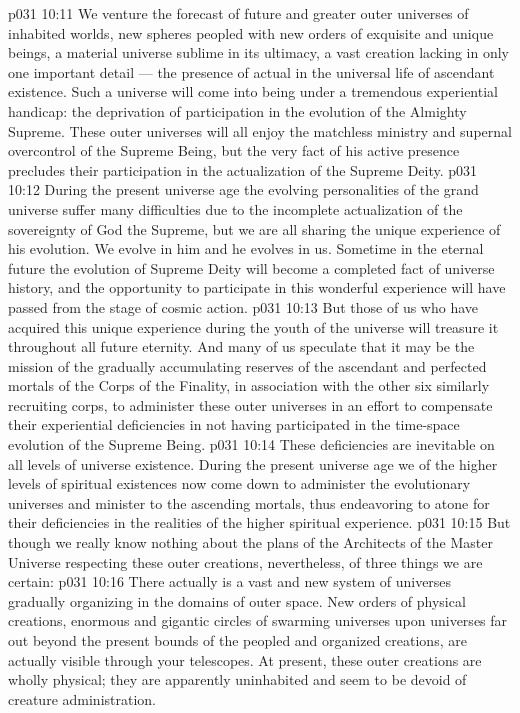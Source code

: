 \vs p031 10:11 We venture the forecast of future and greater outer universes of inhabited worlds, new spheres peopled with new orders of exquisite and unique beings, a material universe sublime in its ultimacy, a vast creation lacking in only one important detail --- the presence of actual  in the universal life of ascendant existence. Such a universe will come into being under a tremendous experiential handicap: the deprivation of participation in the evolution of the Almighty Supreme. These outer universes will all enjoy the matchless ministry and supernal overcontrol of the Supreme Being, but the very fact of his active presence precludes their participation in the actualization of the Supreme Deity.
\vs p031 10:12 During the present universe age the evolving personalities of the grand universe suffer many difficulties due to the incomplete actualization of the sovereignty of God the Supreme, but we are all sharing the unique experience of his evolution. We evolve in him and he evolves in us. Sometime in the eternal future the evolution of Supreme Deity will become a completed fact of universe history, and the opportunity to participate in this wonderful experience will have passed from the stage of cosmic action.
\vs p031 10:13 But those of us who have acquired this unique experience during the youth of the universe will treasure it throughout all future eternity. And many of us speculate that it may be the mission of the gradually accumulating reserves of the ascendant and perfected mortals of the Corps of the Finality, in association with the other six similarly recruiting corps, to administer these outer universes in an effort to compensate their experiential deficiencies in not having participated in the time\hyp{}space evolution of the Supreme Being.
\vs p031 10:14 These deficiencies are inevitable on all levels of universe existence. During the present universe age we of the higher levels of spiritual existences now come down to administer the evolutionary universes and minister to the ascending mortals, thus endeavoring to atone for their deficiencies in the realities of the higher spiritual experience.
\vs p031 10:15 But though we really know nothing about the plans of the Architects of the Master Universe respecting these outer creations, nevertheless, of three things we are certain:
\vs p031 10:16 \bibnobreakspace There actually is a vast and new system of universes gradually organizing in the domains of outer space. New orders of physical creations, enormous and gigantic circles of swarming universes upon universes far out beyond the present bounds of the peopled and organized creations, are actually visible through your telescopes. At present, these outer creations are wholly physical; they are apparently uninhabited and seem to be devoid of creature administration.
